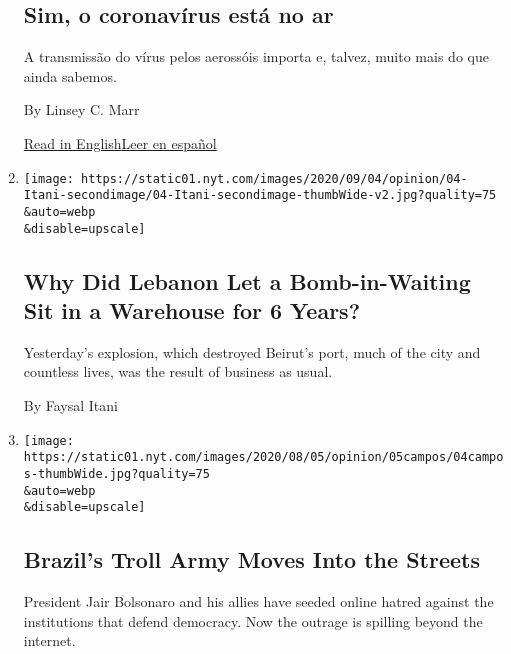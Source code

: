 \begin{enumerate}
{  \subsection{Sim, o coronavírus está no
  ar}\label{sim-o-coronavuxedrus-estuxe1-no-ar}}

  A transmissão do vírus pelos aerossóis importa e, talvez, muito mais
  do que ainda sabemos.

  By Linsey C. Marr

  \href{https://www.nytimes.com/2020/07/30/opinion/coronavirus-aerosols.html}{Read
  in
  English}\href{https://www.nytimes.com/es/2020/08/01/espanol/opinion/coronavirus-aire.html}{Leer
  en español}
\item
  \href{/2020/08/05/opinion/beirut-explosions.html}{}

  \texttt{[image: https://static01.nyt.com/images/2020/09/04/opinion/04-Itani-secondimage/04-Itani-secondimage-thumbWide-v2.jpg?quality=75\\\&auto=webp\\\&disable=upscale]}

  \hypertarget{why-did-lebanon-let-a-bomb-in-waiting-sit-in-a-warehouse-for-6-years}{%
  \subsection{Why Did Lebanon Let a Bomb-in-Waiting Sit in a Warehouse
  for 6
  Years?}\label{why-did-lebanon-let-a-bomb-in-waiting-sit-in-a-warehouse-for-6-years}}

  Yesterday's explosion, which destroyed Beirut's port, much of the city
  and countless lives, was the result of business as usual.

  By Faysal Itani
\item
  \href{/2020/08/04/opinion/bolsonaro-office-of-hate-brazil.html}{}

  \texttt{[image: https://static01.nyt.com/images/2020/08/05/opinion/05campos/04campos-thumbWide.jpg?quality=75\\\&auto=webp\\\&disable=upscale]}

  \hypertarget{brazils-troll-army-moves-into-the-streets}{%
  \subsection{Brazil's Troll Army Moves Into the
  Streets}\label{brazils-troll-army-moves-into-the-streets}}

  President Jair Bolsonaro and his allies have seeded online hatred
  against the institutions that defend democracy. Now the outrage is
  spilling beyond the internet.


\end{enumerate}
